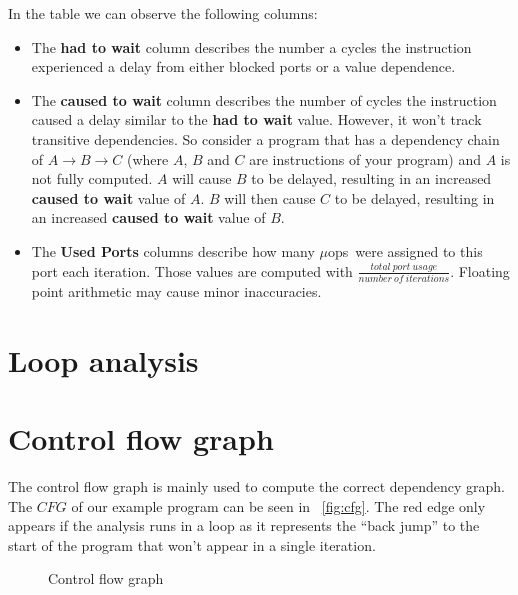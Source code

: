 \documentclass[a4paper,12pt,titlepage, twoside]{report}
\newcommand{\microops}{$\mu$ops}
\begin{document}
In the table we can observe the following columns:
\begin{itemize}
    \item The \textbf{had to wait} column describes the number a cycles the instruction experienced a delay from either blocked ports or a value dependence. 
    \item The \textbf{caused to wait} column describes the number of cycles the instruction caused a delay similar to the \textbf{had to wait} value. However, it won't track transitive dependencies. So consider a program that has a dependency chain of $A \rightarrow B \rightarrow C$ (where $A$, $B$ and $C$ are instructions of your program) and $A$ is not fully computed. $A$ will cause $B$ to be delayed, resulting in an increased \textbf{caused to wait} value of $A$. $B$ will then cause $C$ to be delayed, resulting in an increased \textbf{caused to wait} value of $B$.
    \item The \textbf{Used Ports} columns describe how many \microops\ were assigned to this port each iteration. Those values are computed with $\frac{total\ port\ usage}{number\ of\ iterations}$. Floating point arithmetic may cause minor inaccuracies.
\end{itemize}

\section{Loop analysis}



\section{Control flow graph}
The control flow graph is mainly used to compute the correct dependency graph. The $CFG$ of our example program can be seen in ~\autoref{fig:cfg}. The red edge only appears if the analysis runs in a loop as it represents the ``back jump'' to the start of the program that won't appear in a single iteration.

\begin{figure}
    \centering
    \caption{Control flow graph}
    \label{fig:cfg}
\end{figure}
\end{document}

